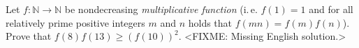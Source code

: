 \problem{}
Let $f \colon \mathbb{N} \to \mathbb{N}$ be nondecreasing \emph{multiplicative function}
(i.\,e. $f(1)=1$ and for all relatively prime positive integers $m$ and $n$ holds that $f(m n) = f(m) f(n)$).
Prove that $f(8) f(13) \geq (f(10))^2$.
\solution
<FIXME: Missing English solution.>
\endproblem
